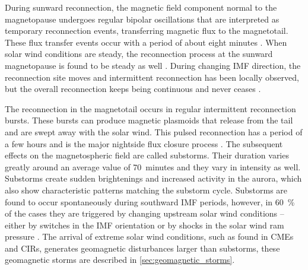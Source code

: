 During sunward reconnection, the magnetic field component normal to the magnetopause undergoes regular bipolar oscillations that are interpreted as temporary reconnection events, transferring magnetic flux to the magnetotail. These flux transfer events occur with a period of about eight minutes \citep{Russell1996}. When solar wind conditions are steady, the reconnection process at the sunward magnetopause is found to be steady as well \citep{Phan2005}. During changing IMF direction, the reconnection site moves and intermittent reconnection has been locally observed, but the overall reconnection keeps being continuous and never ceases \citep{Phan2005}.

The reconnection in the magnetotail occurs in regular intermittent reconnection bursts. These bursts can produce magnetic plasmoids that release from the tail and are swept away with the solar wind. This pulsed reconnection has a period of a few hours and is the major nightside flux closure process \citep{Milan2007}. The subsequent effects on the magnetospheric field are called substorms. Their duration varies greatly around an average value of 70~minutes and they vary in intensity as well. Substorms create sudden brightenings and increased activity in the aurora, which also show characteristic patterns matching the substorm cycle. Substorms are found to occur spontaneously during southward IMF periods, however, in \SI{60}{\percent} of the cases they are triggered by changing upstream solar wind conditions -- either by switches in the IMF orientation or by shocks in the solar wind ram pressure \citep{Milan2007}.
The arrival of extreme solar wind conditions, such as found in CMEs and CIRs, generates geomagnetic disturbances larger than substorms, these geomagnetic storms are described in \autoref{sec:geomagnetic_storms}.

\clearpage


